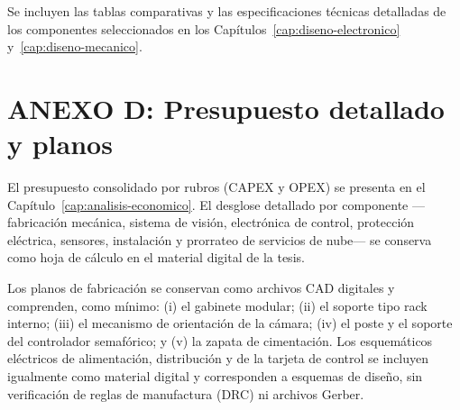 Se incluyen las tablas comparativas y las especificaciones técnicas detalladas de los componentes
seleccionados en los Capítulos~\ref{cap:diseno-electronico} y~\ref{cap:diseno-mecanico}.



\section*{ANEXO D: Presupuesto detallado y planos}
\label{anexo:planos}

El presupuesto consolidado por rubros (CAPEX y OPEX) se presenta en el Capítulo~\ref{cap:analisis-economico}.
El desglose detallado por componente —fabricación mecánica, sistema de visión, electrónica de control,
protección eléctrica, sensores, instalación y prorrateo de servicios de nube— se conserva como hoja de
cálculo en el material digital de la tesis.

Los planos de fabricación se conservan como archivos CAD digitales y comprenden, como mínimo: (i) el
gabinete modular; (ii) el soporte tipo rack interno; (iii) el mecanismo de orientación de la cámara; (iv) el
poste y el soporte del controlador semafórico; y (v) la zapata de cimentación. Los esquemáticos eléctricos
de alimentación, distribución y de la tarjeta de control se incluyen igualmente como material digital y
corresponden a esquemas de diseño, sin verificación de reglas de manufactura (DRC) ni archivos Gerber.
